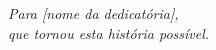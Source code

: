 \thispagestyle{empty}
\vspace*{5cm}
\begin{flushright}
\textit{Para [nome da dedicatória],\\
que tornou esta história possível.}
\end{flushright}
\clearpage
